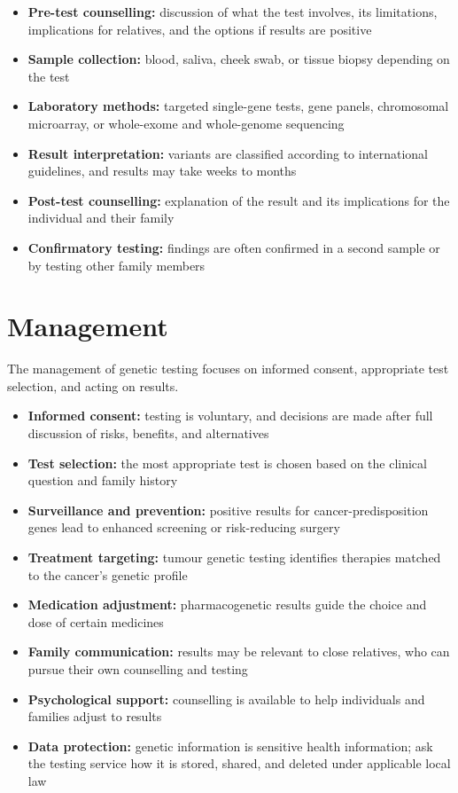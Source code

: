 \begin{itemize}
    \item \textbf{Pre-test counselling:} discussion of what the test involves, its limitations, implications for relatives, and the options if results are positive
    \item \textbf{Sample collection:} blood, saliva, cheek swab, or tissue biopsy depending on the test
    \item \textbf{Laboratory methods:} targeted single-gene tests, gene panels, chromosomal microarray, or whole-exome and whole-genome sequencing
    \item \textbf{Result interpretation:} variants are classified according to international guidelines, and results may take weeks to months
    \item \textbf{Post-test counselling:} explanation of the result and its implications for the individual and their family
    \item \textbf{Confirmatory testing:} findings are often confirmed in a second sample or by testing other family members
\end{itemize}

\section*{Management}
The management of genetic testing focuses on informed consent, appropriate test selection, and acting on results.

\begin{itemize}
    \item \textbf{Informed consent:} testing is voluntary, and decisions are made after full discussion of risks, benefits, and alternatives
    \item \textbf{Test selection:} the most appropriate test is chosen based on the clinical question and family history
    \item \textbf{Surveillance and prevention:} positive results for cancer-predisposition genes lead to enhanced screening or risk-reducing surgery
    \item \textbf{Treatment targeting:} tumour genetic testing identifies therapies matched to the cancer's genetic profile
    \item \textbf{Medication adjustment:} pharmacogenetic results guide the choice and dose of certain medicines
    \item \textbf{Family communication:} results may be relevant to close relatives, who can pursue their own counselling and testing
    \item \textbf{Psychological support:} counselling is available to help individuals and families adjust to results
    \item \textbf{Data protection:} genetic information is sensitive health information; ask the testing service how it is stored, shared, and deleted under applicable local law
\end{itemize}

